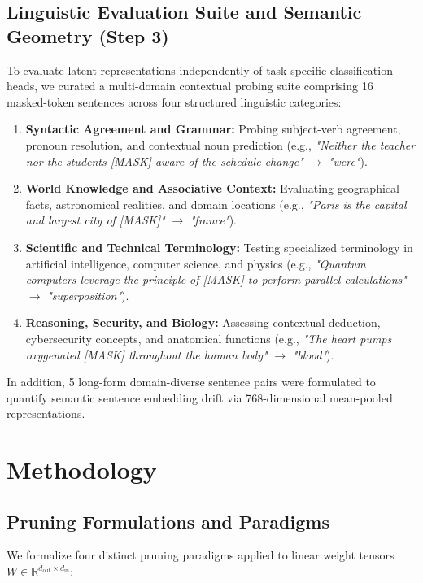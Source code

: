 \documentclass[conference]{IEEEtran}
\begin{document}
\subsection{Linguistic Evaluation Suite and Semantic Geometry (Step 3)}
To evaluate latent representations independently of task-specific classification heads, we curated a multi-domain contextual probing suite comprising 16 masked-token sentences across four structured linguistic categories:
\begin{enumerate}
    \item \textbf{Syntactic Agreement and Grammar:} Probing subject-verb agreement, pronoun resolution, and contextual noun prediction (e.g., \textit{"Neither the teacher nor the students [MASK] aware of the schedule change"} $\to$ \textit{"were"}).
    \item \textbf{World Knowledge and Associative Context:} Evaluating geographical facts, astronomical realities, and domain locations (e.g., \textit{"Paris is the capital and largest city of [MASK]"} $\to$ \textit{"france"}).
    \item \textbf{Scientific and Technical Terminology:} Testing specialized terminology in artificial intelligence, computer science, and physics (e.g., \textit{"Quantum computers leverage the principle of [MASK] to perform parallel calculations"} $\to$ \textit{"superposition"}).
    \item \textbf{Reasoning, Security, and Biology:} Assessing contextual deduction, cybersecurity concepts, and anatomical functions (e.g., \textit{"The heart pumps oxygenated [MASK] throughout the human body"} $\to$ \textit{"blood"}).
\end{enumerate}
In addition, 5 long-form domain-diverse sentence pairs were formulated to quantify semantic sentence embedding drift via 768-dimensional mean-pooled representations.

\section{Methodology}
\subsection{Pruning Formulations and Paradigms}
We formalize four distinct pruning paradigms applied to linear weight tensors $W \in \mathbb{R}^{d_{\text{out}} \times d_{\text{in}}}$:
\end{document}
